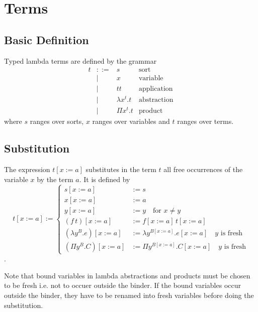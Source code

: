 \section{Terms}

\subsection{Basic Definition}

\begin{definition}
  Typed lambda terms are defined by the grammar
  $$
  \begin{array}{llll}
    t &::=& s                 &\text{sort}
    \\
      &\mid& x                &\text{variable}
    \\
      &\mid& t t              &\text{application}
    \\
      &\mid& \lambda x^t.t    &\text{abstraction}
    \\
      &\mid& \Pi x^t.t        &\text{product}
  \end{array}
  $$
  where $s$ ranges over sorts, $x$ ranges over variables and $t$ ranges over
  terms.
\end{definition}

\subsection{Substitution}

\begin{definition}
  The expression $t[x:=a]$ substitutes in the term $t$ all free occurrences of
  the variable $x$ by the term $a$. It is defined by
  $$
  t[x:=a] :=
  \begin{cases}
    s[x:=a] &:= s
    \\
    x[x:=a] &:= a
    \\
    y[x:=a] &:= y \quad\text{for } x \ne y
    \\
    (f \, t)[x:=a] &:= f[x:=a] \, t[x:=a]
    \\
    (\lambda y^B.e)[x:=a] &:= \lambda y^{B[x:=a]}. e[x:=a]
    \quad y \text{ is fresh}
    \\
    (\Pi y^B.C)[x:=a] &:= \Pi y^{B[x:=a]}. C[x:=a]
    \quad y \text{ is fresh}
  \end{cases}
  $$.

  Note that bound variables in lambda abstractions and products must be chosen
  to be fresh i.e. not to occuer outside the binder. If the bound variables
  occur outside the binder, they have to be renamed into fresh variables
  before doing the substitution.
\end{definition}

